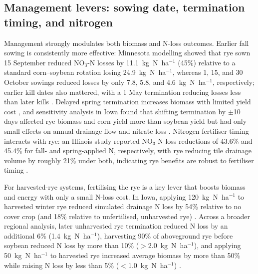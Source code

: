 \documentclass[11pt]{article}
\begin{document}
\subsection{Management levers: sowing date, termination timing, and nitrogen}
Management strongly modulates both biomass and N-loss outcomes. Earlier fall sowing is consistently more effective: Minnesota modelling showed that rye sown 15 September reduced NO$_3$-N losses by 11.1~kg~N~ha$^{-1}$ (45\%) relative to a standard corn--soybean rotation losing 24.9~kg~N~ha$^{-1}$, whereas 1, 15, and 30 October sowings reduced losses by only 7.8, 5.8, and 4.6~kg~N~ha$^{-1}$, respectively; earlier kill dates also mattered, with a 1 May termination reducing losses less than later kills \parencite{Feyereisen2006b}. Delayed spring termination increases biomass with limited yield cost \parencite{Birru2023}, and sensitivity analysis in Iowa found that shifting termination by $\pm$10 days affected rye biomass and corn yield more than soybean yield but had only small effects on annual drainage flow and nitrate loss \parencite{Chatterjee2025}. Nitrogen fertiliser timing interacts with rye: an Illinois study reported NO$_3$-N loss reductions of 43.6\% and 45.4\% for fall- and spring-applied N, respectively, with rye reducing tile drainage volume by roughly 21\% under both, indicating rye benefits are robust to fertiliser timing \parencite{Gupta2022}.

For harvested-rye systems, fertilising the rye is a key lever that boosts biomass and energy with only a small N-loss cost. In Iowa, applying 120~kg~N~ha$^{-1}$ to harvested winter rye reduced simulated drainage N loss by 54\% relative to no cover crop (and 18\% relative to unfertilised, unharvested rye) \parencite{Malone2018}. Across a broader regional analysis, later unharvested rye termination reduced N loss by an additional 6\% (1.4~kg~N~ha$^{-1}$), harvesting 90\% of aboveground rye before soybean reduced N loss by more than 10\% ($>$2.0~kg~N~ha$^{-1}$), and applying 50~kg~N~ha$^{-1}$ to harvested rye increased average biomass by more than 50\% while raising N loss by less than 5\% ($<$1.0~kg~N~ha$^{-1}$) \parencite{Malone2023}.
\end{document}
